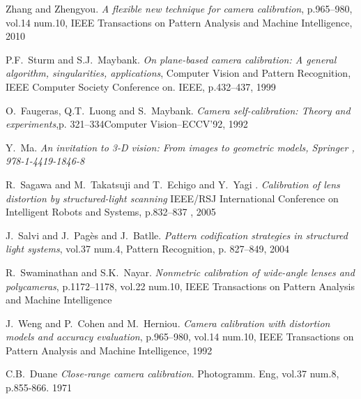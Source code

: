\documentclass[journal,final,a4paper,twoside]{PS}
\begin{document}
%

\begin{thebibliography}{1}
Zhang and Zhengyou. \emph{A flexible new technique for camera calibration}, p.965--980, vol.14 num.10, IEEE Transactions on Pattern Analysis and Machine Intelligence, 2010

P.F.~Sturm and S.J.~Maybank. \emph{On plane-based camera calibration: A general algorithm, singularities, applications}, Computer Vision and Pattern Recognition, IEEE Computer Society Conference on. IEEE, p.432--437, 1999

O.~Faugeras, Q.T.~Luong and S.~Maybank. \emph{Camera self-calibration: Theory and experiments},p. 321--334Computer Vision--ECCV'92, 1992

Y.~Ma. \emph{{An invitation to 3-D vision: From images to geometric models}, {Springer} , {978-1-4419-1846-8}}

R.~Sagawa and M.~Takatsuji and T.~Echigo and Y.~Yagi . \emph{Calibration of lens distortion by structured-light scanning} IEEE/RSJ International Conference on Intelligent Robots and Systems, p.832--837 , 2005

J.~Salvi and J.~Pag{\`e}s and J.~Batlle. \emph{Pattern codification strategies in structured light systems}, vol.37 num.4, Pattern Recognition, p. 827--849, 2004

R.~Swaminathan and S.K.~Nayar. \emph{Nonmetric calibration of wide-angle lenses and polycameras}, p.1172--1178, vol.22 num.10, IEEE Transactions on Pattern Analysis and Machine Intelligence

J.~Weng and P.~Cohen and M.~Herniou. \emph{Camera calibration with distortion models and accuracy evaluation}, p.965--980, vol.14 num.10, IEEE Transactions on Pattern Analysis and Machine Intelligence, 1992

C.B.~Duane  \emph{Close-range camera calibration}. Photogramm. Eng, vol.37 num.8, p.855-866. 1971


\end{thebibliography}
\end{document}
